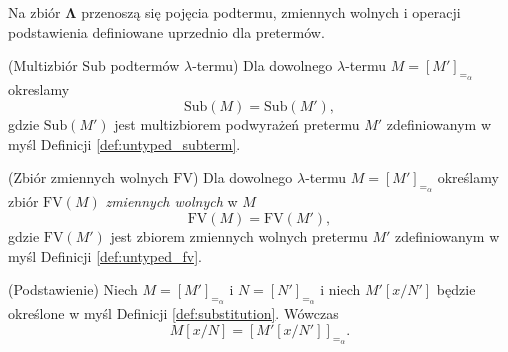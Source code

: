 Na zbiór \(\mathbf{\Lambda}\) przenoszą się pojęcia podtermu, zmiennych wolnych i operacji podstawienia definiowane uprzednio dla pretermów.

\begin{definicja}(Multizbiór \(\mathrm{Sub}\) podtermów \(\lambda\)-termu)
  Dla dowolnego \(\lambda\)-termu \(M=[M']_{=_{\alpha}}\) okreslamy
  \[
    \mathrm{Sub}(M)=\mathrm{Sub}(M'),
  \]
  gdzie \(\mathrm{Sub}(M')\) jest multizbiorem podwyrażeń pretermu \(M'\) zdefiniowanym w myśl Definicji \ref{def:untyped_subterm}.
\end{definicja}

\begin{definicja}(Zbiór zmiennych wolnych \(\mathrm{FV}\))
  Dla dowolnego \(\lambda\)-termu \(M=[M']_{=_{\alpha}}\) określamy zbiór \(\mathrm{FV}(M)\) \emph{zmiennych wolnych} w \(M\)
  \[
    \mathrm{FV}(M)=\mathrm{FV}(M'),
  \]
  gdzie \(\mathrm{FV}(M')\) jest zbiorem zmiennych wolnych pretermu \(M'\) zdefiniowanym w myśl Definicji \ref{def:untyped_fv}.
\end{definicja}

\begin{definicja}(Podstawienie)\label{def:untyped_lambda_substitution}
  Niech \(M=[M']_{=_\alpha}\) i \(N=[N']_{=_\alpha}\) i niech \(M'[x/N']\) będzie określone w myśl Definicji \ref{def:substitution}. Wówczas
  \[
    M[x/N]= [M'[x/N']]_{=_\alpha}.
  \]
\end{definicja}

